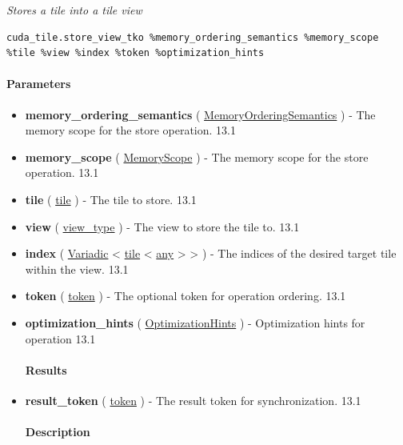 \documentclass{article}
\begin{document}
\textit{Stores a tile into a tile view}


\begin{lstlisting}
cuda_tile.store_view_tko %memory_ordering_semantics %memory_scope %tile %view %index %token %optimization_hints
\end{lstlisting}

\paragraph{Parameters}

\begin{itemize}
\item \textbf{memory\_ordering\_semantics} ( \href{https://docs.nvidia.com/cuda/tile-ir/latest/sections/operations.html#op-attribute-cuda-tile-store-view-tko-memoryorderingsemantics-attr}{MemoryOrderingSemantics} ) - The memory scope for the store operation. 13.1
\item \textbf{memory\_scope} ( \href{https://docs.nvidia.com/cuda/tile-ir/latest/sections/operations.html#op-attribute-cuda-tile-store-view-tko-memoryscope-attr}{MemoryScope} ) - The memory scope for the store operation. 13.1
\item \textbf{tile} ( \href{https://docs.nvidia.com/cuda/tile-ir/latest/sections/types.html#type-tile}{tile} ) - The tile to store. 13.1
\item \textbf{view} ( \href{https://docs.nvidia.com/cuda/tile-ir/latest/sections/operations.html#type-view-type}{view\_type} ) - The view to store the tile to. 13.1
\item \textbf{index} ( \href{https://docs.nvidia.com/cuda/tile-ir/latest/sections/operations.html#type-variadic}{Variadic} < \href{https://docs.nvidia.com/cuda/tile-ir/latest/sections/types.html#type-tile}{tile} < \href{https://docs.nvidia.com/cuda/tile-ir/latest/sections/operations.html#type-any}{any} > > ) - The indices of the desired target tile within the view. 13.1
\item \textbf{token} ( \href{https://docs.nvidia.com/cuda/tile-ir/latest/sections/operations.html#type-token}{token} ) - The optional token for operation ordering. 13.1
\item \textbf{optimization\_hints} ( \href{https://docs.nvidia.com/cuda/tile-ir/latest/sections/operations.html#op-attribute-cuda-tile-store-view-tko-optimizationhints-attr}{OptimizationHints} ) - Optimization hints for operation 13.1


\paragraph{Results}

\item \textbf{result\_token} ( \href{https://docs.nvidia.com/cuda/tile-ir/latest/sections/operations.html#type-token}{token} ) - The result token for synchronization. 13.1


\paragraph{Description}

\end{itemize}
\end{document}
